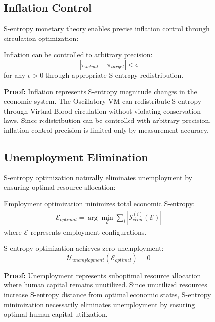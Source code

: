 \begin{figure}[h]
    \subsection{Inflation Control}
    
    S-entropy monetary theory enables precise inflation control through circulation optimization:
    
    \begin{theorem}
    Inflation can be controlled to arbitrary precision:
    \begin{equation}
    |\pi_{actual} - \pi_{target}| < \epsilon
    \end{equation}
    for any $\epsilon > 0$ through appropriate S-entropy redistribution.
    
    \textbf{Proof:}
    Inflation represents S-entropy magnitude changes in the economic system. The Oscillatory VM can redistribute S-entropy through Virtual Blood circulation without violating conservation laws. Since redistribution can be controlled with arbitrary precision, inflation control precision is limited only by measurement accuracy.
    \end{theorem}
    
    \subsection{Unemployment Elimination}
    
    S-entropy optimization naturally eliminates unemployment by ensuring optimal resource allocation:
    
    \begin{definition}
    Employment optimization minimizes total economic S-entropy:
    \begin{align}
    \mathcal{E}_{optimal} = \arg\min_{\mathcal{E}} \sum_{i} |\mathcal{S}_{econ}^{(i)}(\mathcal{E})|
    \end{align}
    where $\mathcal{E}$ represents employment configurations.
    \end{definition}
    
    \begin{corollary}
    S-entropy optimization achieves zero unemployment:
    \begin{equation}
    \mathcal{U}_{unemployment}(\mathcal{E}_{optimal}) = 0
    \end{equation}
    
    \textbf{Proof:}
    Unemployment represents suboptimal resource allocation where human capital remains unutilized. Since unutilized resources increase S-entropy distance from optimal economic states, S-entropy minimization necessarily eliminates unemployment by ensuring optimal human capital utilization.
    \end{corollary}
    

\end{figure}
